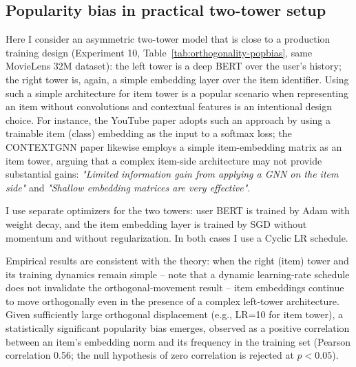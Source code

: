 \subsection{Popularity bias in practical two-tower setup}

Here I consider an asymmetric two-tower model that is close to a production training design (Experiment 10, Table~\ref{tab:orthogonality-popbias}, same MovieLens 32M dataset): the left tower is a deep BERT over the user's history; the right tower is, again, a simple embedding layer over the item identifier. 
Using such a simple architecture for item tower is a popular scenario when representing an item without convolutions and contextual features is an intentional design choice. 
For instance, the YouTube paper adopts such an approach by using a trainable item (class) embedding as the input to a softmax loss; 
the CONTEXTGNN paper likewise employs a simple item-embedding matrix as an item tower, arguing that a complex item-side architecture may not provide substantial gains: \emph{"Limited information gain from applying a GNN on the item side"} and \emph{"Shallow embedding matrices are very effective"}.

I use separate optimizers for the two towers: user BERT is trained by Adam with weight decay, and the item embedding layer is trained by SGD without momentum and without regularization. 
In both cases I use a Cyclic LR schedule. 

Empirical results are consistent with the theory: when the right (item) tower and its training dynamics remain simple -- note that a dynamic learning-rate schedule does not invalidate the orthogonal‑movement result -- item embeddings continue to move orthogonally even in the presence of a complex left‑tower architecture.
Given sufficiently large orthogonal displacement (e.g., LR=10 for item tower), a statistically significant popularity bias emerges, observed as a positive correlation between an item’s embedding norm and its frequency in the training set (Pearson correlation 0.56; the null hypothesis of zero correlation is rejected at $p<0.05$).


